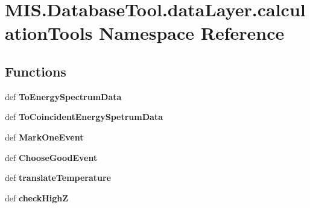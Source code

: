 \hypertarget{namespaceMIS_1_1DatabaseTool_1_1dataLayer_1_1calculationTools}{}\section{M\+I\+S.\+Database\+Tool.\+data\+Layer.\+calculation\+Tools Namespace Reference}
\label{namespaceMIS_1_1DatabaseTool_1_1dataLayer_1_1calculationTools}
\subsection*{Functions}
\begin{DoxyCompactItemize}
\item 
\mbox{\label{namespaceMIS_1_1DatabaseTool_1_1dataLayer_1_1calculationTools_a689e66e24ec978ea6038a019e967f8fe}} 
def {\bfseries To\+Energy\+Spectrum\+Data}
\item 
\mbox{\label{namespaceMIS_1_1DatabaseTool_1_1dataLayer_1_1calculationTools_ab447cdd440e54e5feb5e4e48a5873f54}} 
def {\bfseries To\+Coincident\+Energy\+Spetrum\+Data}
\item 
\mbox{\label{namespaceMIS_1_1DatabaseTool_1_1dataLayer_1_1calculationTools_a059430bbf9da0012c042b594420c4a08}} 
def {\bfseries Mark\+One\+Event}
\item 
\mbox{\label{namespaceMIS_1_1DatabaseTool_1_1dataLayer_1_1calculationTools_aa346e86be2c1035dfc64b0540da444fa}} 
def {\bfseries Choose\+Good\+Event}
\item 
\mbox{\label{namespaceMIS_1_1DatabaseTool_1_1dataLayer_1_1calculationTools_a7b4396e7b7a7b14c4e994c0330c17b95}} 
def {\bfseries translate\+Temperature}
\item 
\mbox{\label{namespaceMIS_1_1DatabaseTool_1_1dataLayer_1_1calculationTools_aa3e7318f16200e4db0bde6f29b44a19e}} 
def {\bfseries check\+HighZ}

\end{DoxyCompactItemize}
